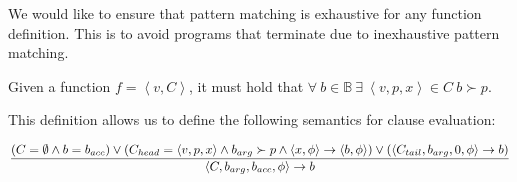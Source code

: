 

We would like to ensure that pattern matching is exhaustive for any function
definition. This is to avoid programs that terminate due to inexhaustive
pattern matching.

\begin{definition}\label{definition:exhaustive} Given a function
$f=\left\langle v, C\right\rangle$, it must hold that $\forall\ b\in\mathbb{B}\
\exists\ \left\langle v,p,x \right\rangle \in C\ b\succ p$.\end{definition}

This definition allows us to define the following semantics for clause
evaluation:

\begin{equation}
{\displaystyle
  \left(
      C=\emptyset
    \wedge
      b=b_{acc}
  \right)
  \vee
  \left(
      C_{head}=\left\langle v,p,x\right\rangle
    \wedge
      b_{arg}\succ p
    \wedge
      \left\langle x,\phi\right\rangle
      \rightarrow
      \left\langle b,\phi\right\rangle
  \right)
  \vee
  \left(
      \left\langle C_{tail},b_{arg},0,\phi\right\rangle
      \rightarrow
      b
  \right)
\over\displaystyle
  \left\langle C,b_{arg},b_{acc},\phi\right\rangle
  \rightarrow
  b
}
\end{equation}
